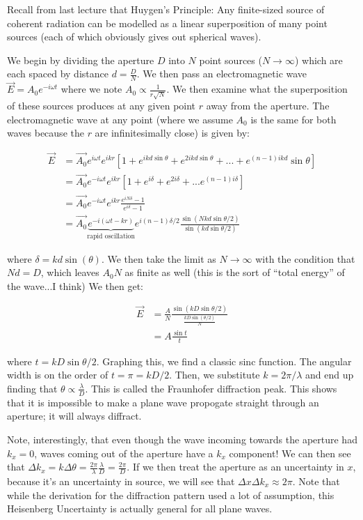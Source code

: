 \documentclass{report}
\begin{document}
Recall from last lecture that Huygen's Principle: Any finite-sized source of coherent radiation can be modelled as a linear superposition of many point sources (each of which obviously gives out spherical waves).

We begin by dividing the aperture $D$ into $N$ point sources ($N \to\infty$) which are each spaced by distance $d = \frac{D}{N}$. We then pass an electromagnetic wave $\vec{E} = A_0e^{-i\omega t}$ where we note $A_0 \propto \frac{1}{r\sqrt{N}}$. We then examine what the superposition of these sources produces at any given point $r$ away from the aperture. The electromagnetic wave at any point (where we assume $A_0$ is the same for both waves because the $r$ are infinitesimally close) is given by:

\begin{align*}
\vec{E} &= \vec{A_0} e^{i\omega t}e^{ikr}\left[1 + e^{ikd\sin\theta} + e^{2ikd\sin\theta} +...+e^{(n-1)ikd}\sin\theta\right]\\
&= \vec{A_0} e^{-i\omega t}e^{ikr}[1 + e^{i\delta} + e^{2i\delta} +...e^{(n-1)i\delta}]\\
&= \vec{A_0}e^{-i\omega t}e^{ikr}\frac{e^{iN\delta}-1}{e^{i\delta} - 1}\\
&= \vec{A_0}\underbrace{e^{-i(\omega t - kr)}}_{\text{rapid oscillation}}e^{i(n-1)\delta/2}\frac{\sin(Nkd\sin\theta/2)}{\sin(kd\sin\theta/2)}
\end{align*}

where $\delta = kd\sin(\theta)$. We then take the limit as $N \to\infty$ with the condition that $Nd = D$, which leaves $A_0N$ as finite as well (this is the sort of ``total energy'' of the wave...I think) We then get:

\begin{align*}
\vec{E} &= \frac{A}{N}\frac{\sin(kD\sin\theta/2)}{\frac{kD\sin(\theta/2)}{N}}\\
&= A\frac{\sin t}{t}
\end{align*}

where $t = kD\sin\theta/2$. Graphing this, we find a classic sinc function. The angular width is on the order of $t = \pi = kD/2$. Then, we substitute $k = 2\pi/\lambda$ and end up finding that $\theta \propto \frac{\lambda}{D}$. This is called the Fraunhofer diffraction peak. This shows that it is impossible to make a plane wave propogate straight through an aperture; it will always diffract.

Note, interestingly, that even though the wave incoming towards the aperture had $k_x = 0$, waves coming out of the aperture have a $k_x$ component! We can then see that $\Delta k_x = k \Delta\theta = \frac{2\pi}{\lambda}\frac{\lambda}{D} = \frac{2\pi}{D}$. If we then treat the aperture as an uncertainty in $x$, because it's an uncertainty in source, we will see that $\Delta x \Delta k_x \approx 2\pi$. Note that while the derivation for the diffraction pattern used a lot of assumption, this Heisenberg Uncertainty is actually general for all plane waves.
\end{document}
